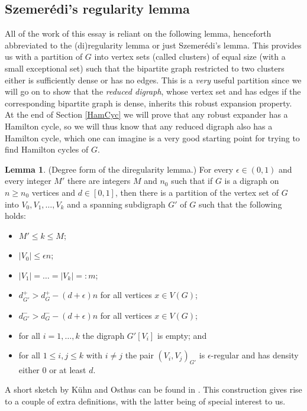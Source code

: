\documentclass[10pt,letterpaper, reqno]{amsart}
\theoremstyle{definition}
\newtheorem{lemma}[thm]{Lemma}
\numberwithin{equation}{section}
\begin{document}
\subsection{Szemerédi's regularity lemma}
All of the work of this essay is reliant on the following lemma, henceforth abbreviated to the (di)regularity lemma or just Szemer\'{e}di's lemma. This provides us with a partition of $G$ into vertex sets (called clusters) of equal size (with a small exceptional set) such that the bipartite graph restricted to two clusters either is sufficiently dense or has no edges. This is a \textit{very} useful partition since we will go on to show that the \textit{reduced digraph}, whose vertex set and has edges if the corresponding bipartite graph is dense, inherits this robust expansion property. At the end of Section \ref{HamCyc} we will prove that any robust expander has a Hamilton cycle, so we will thus know that any reduced digraph also has a Hamilton cycle, which one can imagine is a very good starting point for trying to find Hamilton cycles of $G$. 


\begin{lemma}\label{direg}(Degree form of the diregularity lemma.)
	For every $\epsilon \in (0,1)$ and every integer $M'$ there are integers $M$ and $n_0$ such that if $G$ is a digraph on $n \geq n_0$ vertices and $d \in [0,1]$, then there is a partition of the vertex set of $G$ into $V_0, V_1, \dots, V_k$ and a spanning subdigraph $G'$ of $G$ such that the following holds:
	\begin{itemize}	
		\item $M' \leq k \leq M$; 
		\item $|V_0| \leq \epsilon n$;
		\item $|V_1| = \dots = |V_k| =: m$; 
		\item $d_{G'}^{+} > d_{G}^{+} - (d+ \epsilon)n$ for all vertices $x \in V(G)$;
		\item $d_{G'}^{-} > d_{G}^{-} - (d+ \epsilon)n$ for all vertices $x \in V(G)$;
		\item for all $i=1,\dots, k$ the digraph $G'[V_i]$ is empty; and
		\item for all $1 \leq i,j \leq k$ with $i \neq j$ the pair $(V_i, V_j)_{G'}$ is $\epsilon$-regular and has density either 0 or at least $d$. 
	\end{itemize}
\end{lemma}

\noindent A short sketch by K\"{u}hn and Osthus can be found in \cite{DiregularityLemma}. This construction gives rise to a couple of extra definitions, with the latter being of special interest to us. 
\end{document}
